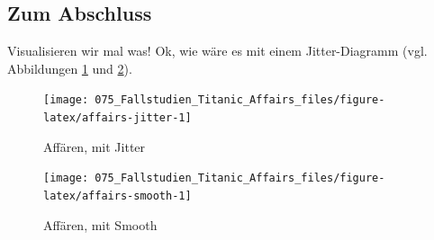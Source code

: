 \documentclass[12pt,ngerman,]{book}
\makeatletter
\newenvironment{Shaded}{\begin{snugshade}}{\end{snugshade}}
\newcommand{\KeywordTok}[1]{\textcolor[rgb]{0.13,0.29,0.53}{\textbf{#1}}}
\newcommand{\DataTypeTok}[1]{\textcolor[rgb]{0.13,0.29,0.53}{#1}}
\newcommand{\DecValTok}[1]{\textcolor[rgb]{0.00,0.00,0.81}{#1}}
\newcommand{\StringTok}[1]{\textcolor[rgb]{0.31,0.60,0.02}{#1}}
\newcommand{\OperatorTok}[1]{\textcolor[rgb]{0.81,0.36,0.00}{\textbf{#1}}}
\newcommand{\NormalTok}[1]{#1}
\newenvironment{kframe}{%
\medskip{}
\setlength{\fboxsep}{.8em}
 \def\at@end@of@kframe{}%
 \ifinner\ifhmode%
  \def\at@end@of@kframe{\end{minipage}}%
  \begin{minipage}{\columnwidth}%
 \fi\fi%
 \def\FrameCommand##1{\hskip\@totalleftmargin \hskip-\fboxsep
 \colorbox{shadecolor}{##1}\hskip-\fboxsep
     \hskip-\linewidth \hskip-\@totalleftmargin \hskip\columnwidth}%
 \MakeFramed {\advance\hsize-\width
   \@totalleftmargin\z@ \linewidth\hsize
   \@setminipage}}%
 {\par\unskip\endMakeFramed%
 \at@end@of@kframe}
\renewenvironment{Shaded}{\begin{kframe}}{\end{kframe}}
\theoremstyle{definition}
\theoremstyle{definition}
\theoremstyle{remark}
\makeatother
\begin{document}
\subsection{Zum Abschluss}\label{zum-abschluss}

Visualisieren wir mal was! Ok, wie wäre es mit einem Jitter-Diagramm
(vgl. Abbildungen \ref{fig:affairs-jitter} und
\ref{fig:affairs-smooth}).

\begin{Shaded}
\end{Shaded}

\begin{figure}

{\centering \texttt{[image: 075\_Fallstudien\_Titanic\_Affairs\_files/figure-latex/affairs-jitter-1]} 

}

\caption{Affären, mit Jitter}\label{fig:affairs-jitter}
\end{figure}

\begin{Shaded}
\end{Shaded}

\begin{figure}

{\centering \texttt{[image: 075\_Fallstudien\_Titanic\_Affairs\_files/figure-latex/affairs-smooth-1]} 

}

\caption{Affären, mit Smooth}\label{fig:affairs-smooth}
\end{figure}
\end{document}
